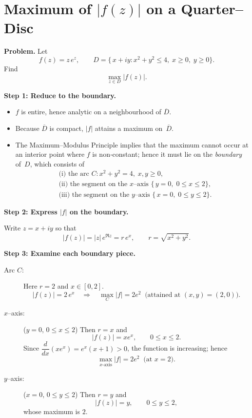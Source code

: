 \documentclass[12pt]{article}
\theoremstyle{definition} %
\theoremstyle{plain} %
\begin{document}
    \section*{Maximum of \boldmath$|f(z)|$ on a Quarter–Disc}

\textbf{Problem.}
Let
\[
  f(z)=z\,e^{z},\qquad 
  D=\bigl\{\,x+iy : x^{2}+y^{2}\le 4,\;x\ge 0,\;y\ge 0\bigr\}.
\]
Find 
\[
  \max_{z\in D} |f(z)|.
\]

\bigskip
\textbf{Step 1:  Reduce to the boundary.}  

\begin{itemize}
  \item $f$ is entire, hence analytic on a neighbourhood of $\overline{D}$.
  \item Because $\overline{D}$ is compact, $|f|$ attains a maximum on~$\overline{D}$.
  \item The Maximum–Modulus Principle implies that the maximum cannot occur
        at an interior point where $f$ is non‑constant; hence it must lie on 
        the \emph{boundary} of~$D$, which consists of
        \[
            \begin{aligned}
              &\text{(i) the arc } C: x^{2}+y^{2}=4,\;x,y\ge 0,\\
              &\text{(ii) the segment on the $x$–axis } \{\,y=0,\;0\le x\le 2\},\\
              &\text{(iii) the segment on the $y$–axis } \{\,x=0,\;0\le y\le 2\}.
            \end{aligned}
        \]
\end{itemize}

\bigskip
\textbf{Step 2:  Express \boldmath$|f|$ on the boundary.}

Write $z=x+iy$ so that
\[
  |f(z)| = |z|\,e^{\Re z}=r\,e^{x},
  \qquad r=\sqrt{x^{2}+y^{2}}.
\]

\bigskip
\textbf{Step 3:  Examine each boundary piece.}

\begin{description}
  \item[Arc $C$:]  Here $r=2$ and $x\in[0,2]$.
        \[
           |f(z)| = 2\,e^{x}\quad\Longrightarrow\quad
           \max_{C}|f| = 2e^{2}\ \text{ (attained at $(x,y)=(2,0)$).}
        \]

  \item[$x$–axis:]  ($y=0$, $0\le x\le 2$)  Then $r=x$ and
        \[
           |f(z)| = x e^{x},\qquad 0\le x\le 2.
        \]
        Since $\dfrac{d}{dx}(x e^{x}) = e^{x}(x+1)>0$, the function
        is increasing; hence
        \[
           \max_{x\text{-axis}} |f| = 2e^{2}\ \text{ (at $x=2$).}
        \]

  \item[$y$–axis:]  ($x=0$, $0\le y\le 2$)  Then $r=y$ and
        \[
            |f(z)| = y,\qquad 0\le y\le 2,
        \]
        whose maximum is $2$.
\end{description}
\end{document}

